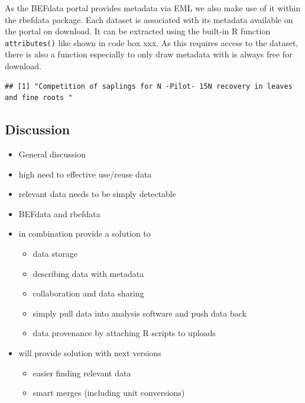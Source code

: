 \documentclass[]{article}
\newenvironment{Shaded}{}{}
\newcommand{\KeywordTok}[1]{\textcolor[rgb]{0.00,0.44,0.13}{\textbf{{#1}}}}
\newcommand{\DecValTok}[1]{\textcolor[rgb]{0.25,0.63,0.44}{{#1}}}
\newcommand{\NormalTok}[1]{{#1}}
\begin{document}
As the BEFdata portal provides metadata via EML we also make use of it
within the rbefdata package. Each dataset is associated with its
metadata available on the portal on download. It can be extracted using
the built-in R function \texttt{attributes()} like shown in code box
xxx. As this requires access to the dataset, there is also a function
especially to only draw metadata with is always free for download.

\begin{Shaded}
\end{Shaded}

\begin{verbatim}
## [1] "Competition of saplings for N -Pilot- 15N recovery in leaves and fine roots "
\end{verbatim}

\subsection{Discussion}

\begin{itemize}
\item
  General discussion
\item
  high need to effective use/reuse data
\item
  relevant data needs to be simply detectable
\item
  BEFdata and rbefdata
\item
  in combination provide a solution to

  \begin{itemize}
  \itemsep1pt\parskip0pt
  \item
    data storage
  \item
    describing data with metadata
  \item
    collaboration and data sharing
  \item
    simply pull data into analysis software and push data back
  \item
    data provenance by attaching R scripts to uploads
  \end{itemize}
\item
  will provide solution with next versions

  \begin{itemize}
  \itemsep1pt\parskip0pt
  \item
    easier finding relevant data
  \item
    smart merges (including unit conversions)
  \end{itemize}
\end{itemize}
\end{document}
